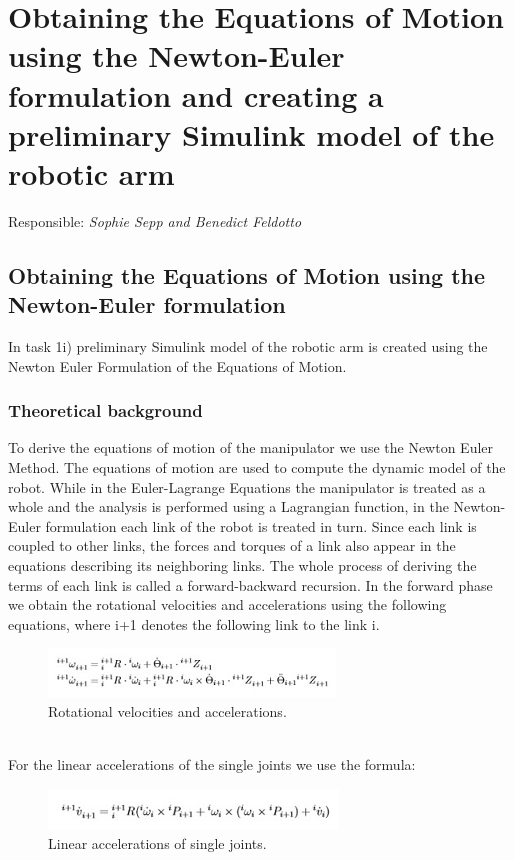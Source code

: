 \chapter{Obtaining the Equations of Motion using the Newton-Euler formulation and 
creating a preliminary Simulink model of the robotic arm}\label{chapter:1}
\vspace{-0.25cm}
Responsible: \textit{Sophie Sepp and Benedict Feldotto}

\section{Obtaining the Equations of Motion using the Newton-Euler formulation}
In task 1i) preliminary Simulink model of the robotic arm is created using the Newton Euler Formulation of the Equations of Motion. 



\subsection{Theoretical background}
To derive the equations of motion of the manipulator we use the Newton Euler Method. The equations of motion are used to compute the dynamic model of the robot. While in the Euler-Lagrange Equations the manipulator is treated as a whole and the analysis is performed using a Lagrangian function, in the Newton-Euler formulation each link of the robot is treated in turn.  Since each link is coupled to other links, the forces and torques of a link also appear in the equations describing its neighboring links. The whole process of deriving the terms of each link is called a forward-backward recursion.
In the forward phase we obtain the rotational velocities and accelerations using the following equations, where i+1 denotes the following link to the link i.


\begin{figure}[htsb]
  \centering
  \includegraphics{figures/Rotational velocities and accelerations.jpg}
  \caption{Rotational velocities and accelerations.}
\end{figure}

\\For the linear accelerations of the single joints we use the formula:
\ \\
\begin{figure}
  \centering
  \includegraphics{figures/Linear accelerations of single joints.jpg}
  \caption{Linear accelerations of single joints.}
\end{figure}





